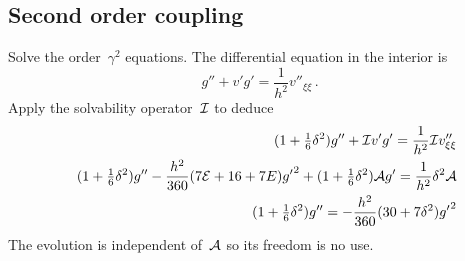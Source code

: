 \documentclass[a5paper]{article}
\newcommand{\cA}{{\cal A}}
\newcommand{\cE}{{\cal E}}
\newcommand{\cI}{{\cal I}}
\newcommand{\uzero}{\xi+(1-\xi)\cE}
\begin{document}
\subsection{Second order coupling}

Solve the order~$\gamma^2$ equations.
The differential equation in the interior is
\begin{equation}
	[\uzero]g''+v'g'=\frac{1}{h^2}v''_{\xi\xi}\,.
	\label{eq:vddeqn}
\end{equation}
Apply the solvability operator~$\cI$ to deduce
\begin{eqnarray}
&&	(1+\rat16\delta^2)g''+\cI v'g'= \frac{1}{h^2}\cI v''_{\xi\xi} 
	\nonumber \\
&&	(1+\rat16\delta^2)g'' -\frac{h^2}{360}(7\cE+16+7E){g'}^2 
	+(1+\rat16\delta^2)\cA g' = \frac{1}{h^2}\delta^2\cA \nonumber \\
&&	(1+\rat16\delta^2)g''= -\frac{h^2}{360}(30+7\delta^2){g'}^2
\end{eqnarray}
The evolution is independent of~$\cA$ so its freedom is no use.
\end{document}
